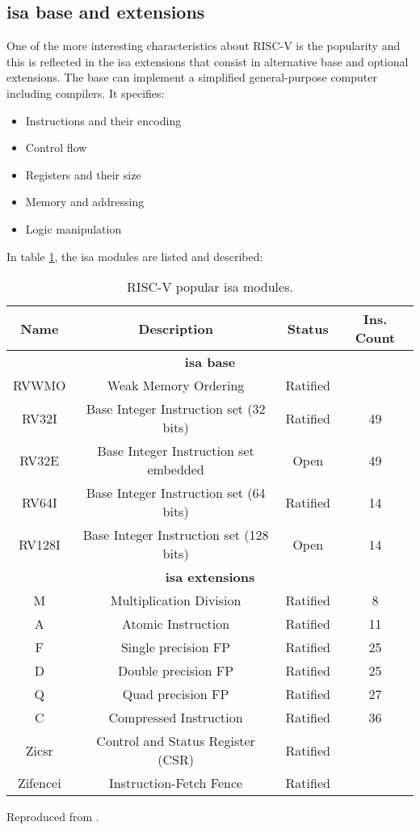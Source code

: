 \subsection{\gls{isa} base and extensions} 
One of the more interesting characteristics about RISC-V is the popularity and this is reflected in the \gls{isa} extensions that consist in alternative base and optional extensions. The base can implement a simplified general-purpose computer including compilers. It specifies: 

\begin{itemize}
	\item Instructions and their encoding
	\item Control flow
	\item Registers and their size
	\item Memory and addressing
	\item Logic manipulation
\end{itemize}

In table \ref{tab:isa}, the \gls{isa} modules are listed and described:

\begin{table}[H]
\centering
\begin{tabular}{|c|c|c|c|}
\hline
\textbf{Name} & \textbf{Description} & \textbf{Status}  & \textbf{Ins. Count}  \\ \hline

\multicolumn{4}{|c|}{\textbf{\gls{isa} base}} \\ \hline
RVWMO & Weak Memory Ordering & Ratified & \\ \hline
RV32I & Base Integer Instruction set (32 bits) & Ratified & 49 \\ \hline
RV32E & Base Integer Instruction set embedded & Open & 49 \\ \hline
RV64I & Base Integer Instruction set (64 bits) & Ratified & 14 \\ \hline
RV128I & Base Integer Instruction set (128 bits) & Open & 14 \\ \hline

\multicolumn{4}{|c|}{\textbf{\gls{isa} extensions}} \\ \hline

M & Multiplication Division & Ratified & 8\\ \hline
A & Atomic Instruction & Ratified & 11 \\ \hline
F & Single precision FP & Ratified & 25 \\ \hline
D & Double precision FP & Ratified & 25 \\ \hline
Q & Quad precision FP & Ratified & 27 \\ \hline
C & Compressed Instruction & Ratified & 36 \\ \hline
Zicsr & Control and Status Register (CSR) & Ratified &  \\ \hline
Zifencei & Instruction-Fetch Fence & Ratified & \\ \hline
\end{tabular}
\caption{RISC-V popular \gls{isa} modules.} Reproduced from \cite{riscvg}.
\label{tab:isa}
\end{table}

